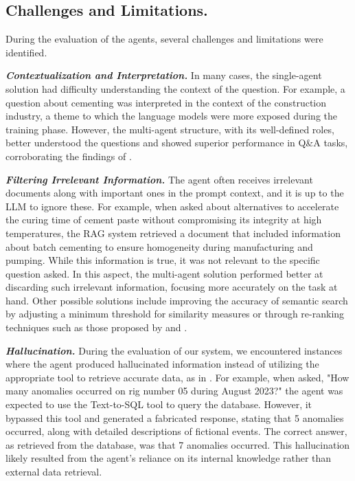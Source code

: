         \subsection{Challenges and Limitations.}     
            During the evaluation of the agents, several challenges and limitations were identified.

            \setlength{\parindent}{1em}
            \textbf{\textit{Contextualization and Interpretation.}} 
                In many cases, the single-agent solution had difficulty understanding the context of the question. For example, a question about cementing was interpreted in the context of the construction industry, a theme to which the language models were more exposed during the training phase. 
                However, the multi-agent structure, with its well-defined roles, better understood the questions and showed superior performance in Q\&A tasks, corroborating the findings of \citep{Li2024}.
            
            \setlength{\parindent}{1em}
            \textbf{\textit{Filtering Irrelevant Information.}} 
                The agent often receives irrelevant documents along with important ones in the prompt context, and it is up to the LLM to ignore these. 
                For example, when asked about alternatives to accelerate the curing time of cement paste without compromising its integrity at high temperatures, the RAG system retrieved a document that included information about batch cementing to ensure homogeneity during manufacturing and pumping. 
                While this information is true, it was not relevant to the specific question asked. 
                In this aspect, the multi-agent solution performed better at discarding such irrelevant information, focusing more accurately on the task at hand. 
                Other possible solutions include improving the accuracy of semantic search by adjusting a minimum threshold for similarity measures or through re-ranking techniques such as those proposed by \citep{Carraro2024} and \citep{Sun2023}.
            
            \setlength{\parindent}{1em}
            \textbf{\textit{Hallucination.}} 
                During the evaluation of our system, we encountered instances where the agent produced hallucinated information instead of utilizing the appropriate tool to retrieve accurate data, as in \citep{Bilbao2023}. 
                For example, when asked, "How many anomalies occurred on rig number 05 during August 2023?" the agent was expected to use the Text-to-SQL tool to query the database. 
                However, it bypassed this tool and generated a fabricated response, stating that 5 anomalies occurred, along with detailed descriptions of fictional events. The correct answer, as retrieved from the database, was that 7 anomalies occurred. This hallucination likely resulted from the agent's reliance on its internal knowledge rather than external data retrieval. 

